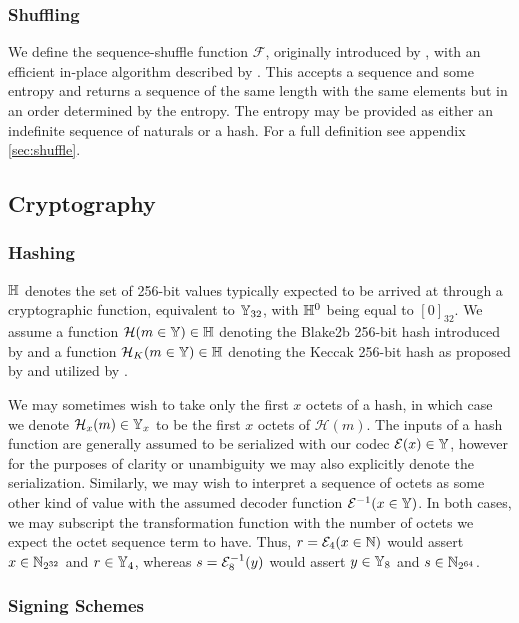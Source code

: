 \subsubsection{Shuffling}

We define the sequence-shuffle function $\mathcal{F}$, originally introduced by \cite{fisheryates1938statistical}, with an efficient in-place algorithm described by \cite{wikipedia2024fisheryates}. This accepts a sequence and some entropy and returns a sequence of the same length with the same elements but in an order determined by the entropy. The entropy may be provided as either an indefinite sequence of naturals or a hash. For a full definition see appendix \ref{sec:shuffle}.

\subsection{Cryptography}\label{sec:cryptography}

\subsubsection{Hashing}

$\mathbb{H}$ denotes the set of 256-bit values typically expected to be arrived at through a cryptographic function, equivalent to $\mathbb{Y}_{32}$, with $\mathbb{H}^0$ being equal to $[0]_{32}$. We assume a function $\mathcal{H}(m \in \mathbb{Y}) \in \mathbb{H}$ denoting the Blake2b 256-bit hash introduced by \cite{rfc7693} and a function $\mathcal{H}_K(m \in \mathbb{Y}) \in \mathbb{H}$ denoting the Keccak 256-bit hash as proposed by \cite{bertoni2013keccak} and utilized by \cite{wood2014ethereum}.

We may sometimes wish to take only the first $x$ octets of a hash, in which case we denote $\mathcal{H}_x(m) \in \mathbb{Y}_x$ to be the first $x$ octets of $\mathcal{H}(m)$. The inputs of a hash function are generally assumed to be serialized with our codec $\mathcal{E}(x) \in \mathbb{Y}$, however for the purposes of clarity or unambiguity we may also explicitly denote the serialization. Similarly, we may wish to interpret a sequence of octets as some other kind of value with the assumed decoder function $\mathcal{E}^{-1}(x \in \mathbb{Y})$. In both cases, we may subscript the transformation function with the number of octets we expect the octet sequence term to have. Thus, $r = \mathcal{E}_4(x \in \mathbb{N})$ would assert $x \in \mathbb{N}_{2^{32}}$ and $r \in \mathbb{Y}_4$, whereas $s = \mathcal{E}^{-1}_8(y)$ would assert $y \in \mathbb{Y}_8$ and $s \in \mathbb{N}_{2^{64}}$.

\subsubsection{Signing Schemes}\label{sec:signing}

